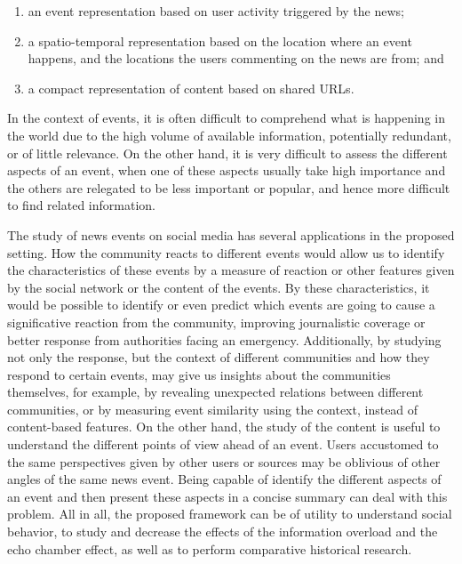 \begin{intro}
\begin{enumerate}
\item an event representation based on user activity triggered by the news;
\item a spatio-temporal representation based on the location where an event
happens, and the locations the users commenting on the news are from; and
\item a compact representation of content based on shared URLs.
\end{enumerate}

In the context of events, it is often
difficult to comprehend what is happening in the world due to the high volume of
available information, potentially redundant, or of little relevance. On the
other hand, it is very difficult to assess the different aspects of an event,
when one of these aspects usually take high importance and the others are
relegated to be less important or popular, and hence more difficult to find
related information.


The study of news events on social media has several applications in the
proposed setting. How the community reacts to different events would allow us to
identify the characteristics of these events by a measure of reaction or other
features given by the social network or the content of the events. By these
characteristics, it would be possible to identify or even predict which events
are going to cause a significative reaction from the community, improving
journalistic coverage or better response from authorities facing an emergency.
Additionally, by studying not only the response, but the context of different
communities and how they respond to certain events, may give us insights about
the communities themselves, for example, by revealing unexpected relations
between different communities, or by measuring event similarity using the
context, instead of content-based features. On the other hand, the study of the
content is useful to understand the different points of view ahead of an event.
Users accustomed to the same perspectives given by other users or sources may be
oblivious of other angles of the same news event. Being capable of identify the
different aspects of an event and then present these aspects in a concise
summary can deal with this problem. All in all, the proposed framework can be of
utility to understand social behavior, to study and decrease the effects of the
information overload and the echo chamber effect, as well as to perform
comparative historical research.






\end{intro}
